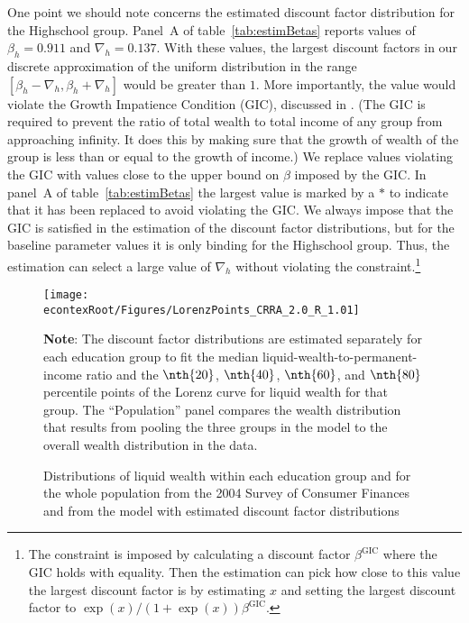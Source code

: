 \documentclass[\econtexRoot/HAFiscal]{subfiles}
\begin{document}
One point we should note concerns the estimated discount factor distribution for the Highschool group.
Panel~A of table~\ref{tab:estimBetas} reports values of $\beta_h=0.911$ and $\nabla_h=0.137$.
With these values, the largest discount factors in our discrete approximation of the uniform distribution in the range $[\beta_h-\nabla_h, \beta_h+\nabla_h]$ would be greater than $1$.
More importantly, the value would violate the Growth Impatience Condition (GIC), discussed in \cite{carroll2022theoretical}.
(The GIC is required to prevent the ratio of total wealth to total income of any group from approaching infinity.
It does this by making sure that the growth of wealth of the group is less than or equal to the growth of income.)
We replace values violating the GIC with values close to the upper bound on $\beta$ imposed by the GIC.
In panel~A of table~\ref{tab:estimBetas} the largest value is marked by a $*$ to indicate that it has been replaced to avoid violating the GIC.
We always impose that the GIC is satisfied in the estimation of the discount factor distributions, but for the baseline parameter values it is only binding for the Highschool group.
Thus, the estimation can select a large value of $\nabla_h$ without violating the constraint.\footnote{The constraint is imposed by calculating a discount factor $\beta^{\text{GIC}}$ where the GIC holds with equality.
Then the estimation can pick how close to this value the largest discount factor is by estimating $x$ and setting the largest discount factor to $\exp(x)/(1+\exp(x)) \beta^{\text{GIC}}$.} 

\begin{figure}[th]
  \begin{center}
    \texttt{[image: \\econtexRoot/Figures/LorenzPoints\_CRRA\_2.0\_R\_1.01]}
    \caption{Distributions of liquid wealth within each education group and for the whole population from the 2004 Survey of Consumer Finances and from the model with estimated discount factor distributions}
    \notinsubfile{\label{fig:LorenzPts}}
    \parbox{16cm}{\small \vspace{.15cm} \textbf{Note}: The discount factor distributions are estimated separately for each education group to fit the median liquid-wealth-to-permanent-income ratio and the $\nth{20}$, $\nth{40}$, $\nth{60}$, and $\nth{80}$ percentile points of the Lorenz curve for liquid wealth for that group. The ``Population'' panel compares the wealth distribution that results from pooling the three groups in the model to the overall wealth distribution in the data.\normalsize}
  \end{center}
\end{figure}
\end{document}
